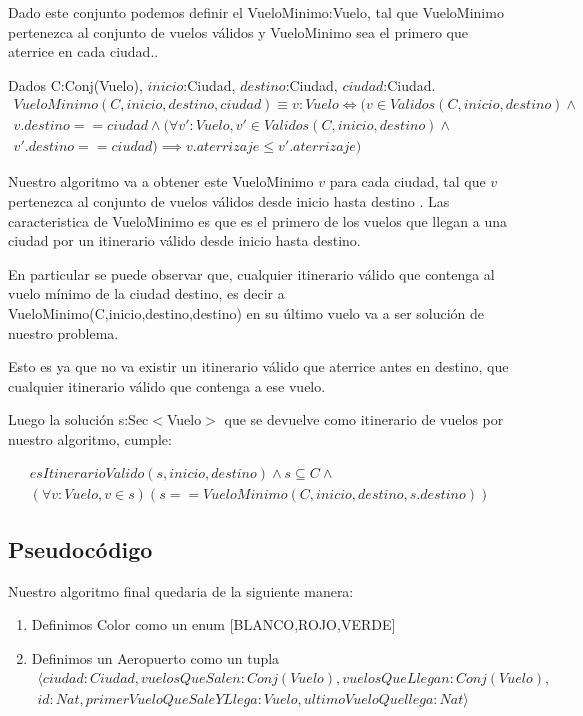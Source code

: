 Dado este conjunto podemos definir el VueloMinimo:Vuelo, tal que VueloMinimo pertenezca al conjunto de vuelos v\'alidos y VueloMinimo sea el primero que aterrice en cada ciudad..

Dados C:Conj(Vuelo), $inicio$:Ciudad, $destino$:Ciudad, $ciudad$:Ciudad.
\begin{align*}
VueloMinimo(C,inicio,destino,ciudad) \equiv v:Vuelo \Leftrightarrow (v \in Validos(C,inicio,destino) \wedge\\ v.destino == ciudad \wedge (\forall v':Vuelo, v' \in Validos(C,inicio,destino) \wedge \\
v'.destino == ciudad) \implies v.aterrizaje \leq v'.aterrizaje)
\end{align*}

Nuestro algoritmo va a obtener este VueloMinimo $v$ para cada ciudad, tal que $v$ pertenezca al conjunto de vuelos v\'alidos desde inicio hasta destino . Las caracteristica de VueloMinimo es que es el primero de los vuelos que llegan a una ciudad por un itinerario v\'alido desde inicio hasta destino.

En particular se puede observar que, cualquier itinerario v\'alido que contenga al vuelo m\'inimo de la ciudad destino, es decir a VueloMinimo(C,inicio,destino,destino) en su \'ultimo vuelo va a ser soluci\'on de nuestro problema. 

Esto es ya que no va existir un itinerario v\'alido que aterrice antes en destino, que cualquier itinerario v\'alido que contenga a ese vuelo.

Luego la soluci\'on s:Sec$<$Vuelo$>$ que se devuelve como itinerario de vuelos por nuestro algoritmo, cumple:

\begin{align*}
esItinerarioValido(s,inicio,destino) \wedge s \subseteq C \wedge \\
(\forall v:Vuelo, v \in s)(s == VueloMinimo(C,inicio,destino,s.destino))
\end{align*}

\subsection{Pseudocódigo}
Nuestro algoritmo final quedaria de la siguiente manera:
\begin{enumerate}
  \item Definimos Color como un enum $[$BLANCO,ROJO,VERDE$]$
  \item Definimos un Aeropuerto como un tupla 
\begin{align*}
\langle ciudad:Ciudad,vuelosQueSalen:
Conj(Vuelo),vuelosQueLlegan:Conj(Vuelo),\\
id:Nat,primerVueloQueSaleYLlega:Vuelo,ultimoVueloQuellega:Nat \rangle 
\end{align*}
\end{enumerate}

